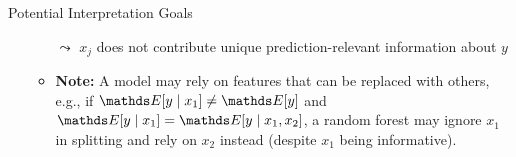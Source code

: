 \documentclass[10pt,compress,t,notes=noshow, xcolor=table]{beamer}
\begin{document}
\begin{frame}{Potential Interpretation Goals}
\begin{enumerate}
\begin{itemize}
      $\leadsto$ $x_j$ does not contribute unique prediction-relevant information about $y$
      \item \textbf{Note:} A model may rely on features that can be replaced with others, e.g., if $\E[y \mid x_1] \neq \E[y]$ and $\E[y \mid x_1] = \E[y \mid x_1, x_2]$, a random forest may ignore $x_1$ in splitting and rely on $x_2$ instead (despite $x_1$ being informative).
    \end{itemize}
\end{enumerate}
\end{frame}





\end{document}
